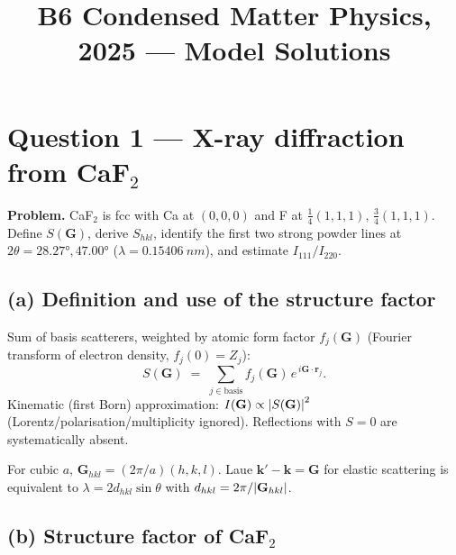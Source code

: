 \documentclass[11pt]{article}
\title{B6 Condensed Matter Physics, 2025 --- Model Solutions}
\author{}
\date{}
\begin{document}
\maketitle

\section*{Question 1 --- X-ray diffraction from CaF$_2$}

\textbf{Problem.} CaF$_2$ is fcc with Ca at $(0,0,0)$ and F at $\tfrac14(1,1,1)$, $\tfrac34(1,1,1)$. Define $S(\mathbf G)$, derive $S_{hkl}$, identify the first two strong powder lines at $2\theta=\ang{28.27},\ang{47.00}$ ($\lambda=\SI{0.15406}{nm}$), and estimate $I_{111}/I_{220}$.

\subsection*{(a) Definition and use of the structure factor}

Sum of basis scatterers, weighted by atomic form factor $f_j(\mathbf G)$ (Fourier transform of electron density, $f_j(0)=Z_j$):
\begin{equation}
S(\mathbf{G}) \;=\; \sum_{j \in \text{basis}} f_j(\mathbf{G})\, e^{\,i\mathbf{G}\cdot\mathbf{r}_j}.
\label{eq:Sdef}
\end{equation}
Kinematic (first Born) approximation: $I(\mathbf G)\propto\abs{S(\mathbf G)}^2$ (Lorentz/polarisation/multiplicity ignored). Reflections with $S=0$ are systematically absent.

For cubic $a$, $\mathbf G_{hkl}=(2\pi/a)(h,k,l)$. Laue $\mathbf k'-\mathbf k=\mathbf G$ for elastic scattering is equivalent to $\lambda=2 d_{hkl}\sin\theta$ with $d_{hkl}=2\pi/\abs{\mathbf G_{hkl}}$.

\subsection*{(b) Structure factor of CaF$_2$}
\end{document}
